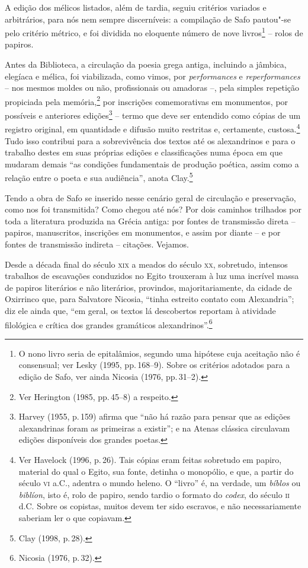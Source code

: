 A edição dos mélicos listados, além de tardia, seguiu critérios variados e
arbitrários, para nós nem sempre discerníveis: a compilação de Safo pautou"-se
pelo critério métrico, e foi dividida no eloquente número de nove
livros\footnote{ O nono livro seria de epitalâmios, segundo uma hipótese cuja
aceitação não é consensual; ver Lesky (1995, pp.\,168--9). Sobre os critérios
adotados para a edição de Safo, ver ainda Nicosia (1976, pp.\,31--2).}  -- rolos de papiros.

Antes da Biblioteca, a circulação da poesia grega antiga, incluindo a jâmbica,
elegíaca e mélica, foi viabilizada, como vimos, por \textit{performances} e
\textit{reperformances} -- nos mesmos moldes ou não, profissionais ou amadoras --, pela
simples repetição propiciada pela memória,\footnote{ Ver Herington (1985, pp.\,45--8) a respeito.} por inscrições comemorativas em monumentos, por possíveis
e anteriores edições\footnote{ Harvey (1955, p.\,159) afirma que “não há razão para pensar
que as edições alexandrinas foram as primeiras a existir”; e na Atenas clássica
circulavam edições disponíveis dos grandes poetas.} -- termo que deve ser
entendido como cópias de um registro original, em quantidade e difusão muito
restritas e, certamente, custosa.\footnote{ Ver Havelock (1996, p.\,26). Tais
cópias eram feitas sobretudo em papiro, material do qual o Egito, sua fonte,
detinha o monopólio, e que, a partir do século \textsc{vi} a.C., adentra o mundo heleno.
O “livro” é, na verdade, um \textit{bíblos} ou \textit{biblíon}, isto é, rolo
de papiro, sendo tardio o formato do \textit{codex}, do século \textsc{ii} d.C. Sobre
os copistas, muitos devem ter sido escravos, e não necessariamente saberiam ler
o que copiavam.} Tudo isso contribui para a sobrevivência dos textos até os
alexandrinos e para o trabalho destes em suas próprias edições e classificações
numa época em que mudaram demais “as condições fundamentais de produção
poética, assim como a relação entre o poeta e sua audiência”, anota Clay.\footnote{ Clay (1998, p.\,28).} 

Tendo a obra de Safo se inserido nesse cenário geral de circulação e
preservação, como nos foi transmitida? Como chegou até nós? Por dois caminhos
trilhados por toda a literatura produzida na Grécia antiga: por fontes de
transmissão direta -- papiros, manuscritos, inscrições em monumentos, e assim
por diante -- e por fontes de transmissão indireta -- citações. Vejamos. 

Desde a década final do século \textsc{xix} a meados do século \textsc{xx}, sobretudo,
intensos trabalhos de escavações conduzidos no Egito trouxeram à luz uma
incrível massa de papiros literários e não literários, provindos,
majoritariamente, da cidade de Oxirrinco que, para Salvatore Nicosia, “tinha
estreito contato com Alexandria”; diz ele ainda que, “em geral, os
textos lá descobertos reportam à atividade filológica e crítica dos grandes
gramáticos alexandrinos”.\footnote{ Nicosia (1976, p.\,32).}

